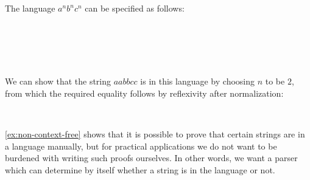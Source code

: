 \begin{example}\label{ex:non-context-free}
The language $a^n b^n c^n$ can be specified as follows:
\begin{code}[hide]%
%
\>[4]\AgdaSpace{}%
\AgdaSymbol{:}\AgdaSpace{}%
\AgdaSpace{}%
\AgdaSpace{}%
\AgdaSpace{}%
\AgdaSpace{}%
\<%
\\
%
\>[4]\AgdaSpace{}%
\AgdaSpace{}%
\AgdaSymbol{\AgdaUnderscore{}}\AgdaSpace{}%
\AgdaSymbol{=}\AgdaSpace{}%
\AgdaInductiveConstructor{[]}\<%
\\
%
\>[4]\AgdaSpace{}%
\AgdaSymbol{(}\AgdaSpace{}%
\AgdaSymbol{)}\AgdaSpace{}%
\AgdaSpace{}%
\AgdaSymbol{=}\AgdaSpace{}%
\AgdaSpace{}%
\AgdaSpace{}%
\AgdaSpace{}%
\AgdaSpace{}%
\<%
\end{code}
\begin{code}%
%
\>[4]\AgdaSpace{}%
\AgdaSymbol{:}\AgdaSpace{}%
\<%
\\
%
\>[4]\AgdaSpace{}%
\AgdaSpace{}%
\AgdaSymbol{=}\AgdaSpace{}%
\AgdaFunction{Σ[}\AgdaSpace{}%
\AgdaSpace{}%
\AgdaSpace{}%
\AgdaSpace{}%
\AgdaFunction{]}\AgdaSpace{}%
\AgdaSpace{}%
\AgdaSpace{}%
\AgdaSpace{}%
\AgdaSpace{}%
\AgdaSpace{}%
\AgdaOperator{\AgdaFunction{++}}\AgdaSpace{}%
\AgdaSpace{}%
\AgdaSpace{}%
\AgdaSpace{}%
\AgdaOperator{\AgdaFunction{++}}\AgdaSpace{}%
\AgdaSpace{}%
\AgdaSpace{}%
\<%
\end{code}
We can show that the string $aabbcc$ is in this language by choosing $n$ to be $2$, from which the required equality follows by reflexivity after normalization:
\begin{code}%
%
\>[4]\AgdaSpace{}%
\AgdaSymbol{:}\AgdaSpace{}%
\AgdaSpace{}%
\<%
\\
%
\>[4]\AgdaSpace{}%
\AgdaSymbol{=}\AgdaSpace{}%
\AgdaSpace{}%
\AgdaOperator{\AgdaInductiveConstructor{,}}\AgdaSpace{}%
\<%
\end{code}
\end{example}
\cref{ex:non-context-free} shows that it is possible to prove that certain strings are in a language manually, but for practical applications we do not want to be burdened with writing such proofs ourselves.
In other words, we want a parser which can determine by itself whether a string is in the language or not.

